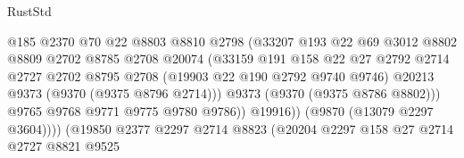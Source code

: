 \begin{lexlean}{RustStd}
\begin{coremodule}
                                        @185
                                        @2370
                                        @70
                                        @22
                                        @8803
                                        @8810
                                        @2798
                                        (@33207
                                          @193
                                          @22
                                          @69
                                          @3012
                                          @8802
                                          @8809
                                          @2702
                                          @8785
                                          @2708
                                          @20074
                                          (@33159
                                            @191
                                            @158
                                            @22
                                            @27
                                            @2792
                                            @2714
                                            @2727
                                            @2702
                                            @8795
                                            @2708
                                            (@19903 @22 @190 @2792 @9740 @9746)
                                            @20213
                                            @9373
                                            (@9370 (@9375 @8796 @2714)))
                                          @9373
                                          (@9370 (@9375 @8786 @8802)))
                                        @9765
                                        @9768
                                        @9771
                                        @9775
                                        @9780
                                        @9786))
                                    @19916))
                                (@9870 (@13079 @2297 @3604))))
                            (@19850
                              @2377
                              @2297
                              @2714
                              @8823
                              (@20204
                                @2297
                                @158
                                @27
                                @2714
                                @2727
                                @8821
                                @9525

\end{coremodule}
\end{lexlean}
